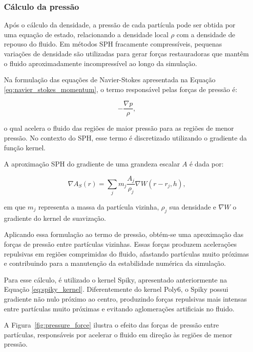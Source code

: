\subsubsection{Cálculo da pressão}

Após o cálculo da densidade, a pressão de cada partícula pode ser obtida por
uma equação de estado, relacionando a densidade local \(\rho\) com a densidade
de repouso do fluido. Em métodos SPH fracamente compressíveis, pequenas
variações de densidade são utilizadas para gerar forças restauradoras que
mantêm o fluido aproximadamente incompressível ao longo da simulação.

Na formulação das equações de Navier-Stokes apresentada na Equação
\ref{eq:navier_stokes_momentum}, o termo responsável pelas forças de pressão é:

\begin{equation}
-\frac{\nabla p}{\rho},
\label{eq:pressure_term}
\end{equation}

o qual acelera o fluido das regiões de maior pressão para as regiões de menor
pressão. No contexto do SPH, esse termo é discretizado utilizando o gradiente
da função kernel.

A aproximação SPH do gradiente de uma grandeza escalar \(A\) é dada por:

\begin{equation}
\nabla A_S(r) =
\sum_j
m_j \frac{A_j}{\rho_j}
\nabla W(r-r_j,h),
\label{eq:sph_gradient}
\end{equation}

em que \(m_j\) representa a massa da partícula vizinha, \(\rho_j\) sua
densidade e \(\nabla W\) o gradiente do kernel de suavização.

Aplicando essa formulação ao termo de pressão, obtém-se uma aproximação das
forças de pressão entre partículas vizinhas. Essas forças produzem acelerações
repulsivas em regiões comprimidas do fluido, afastando partículas muito
próximas e contribuindo para a manutenção da estabilidade numérica da
simulação.

Para esse cálculo, é utilizado o kernel Spiky, apresentado anteriormente na
Equação \ref{eq:spiky_kernel}. Diferentemente do kernel Poly6, o Spiky possui
gradiente não nulo próximo ao centro, produzindo forças repulsivas mais
intensas entre partículas muito próximas e evitando aglomerações artificiais no
fluido.

A Figura~\ref{fig:pressure_force} ilustra o efeito das forças de pressão entre
partículas, responsáveis por acelerar o fluido em direção às regiões de menor
pressão.

